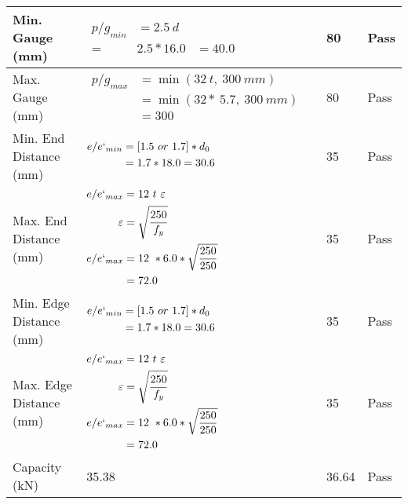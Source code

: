 \documentclass{article}%
\begin{document}
\begin{longtable}{|p{4cm}|p{5cm}|p{5.5cm}|p{1.5cm}|}
\hline%
Min. Gauge (mm)&$\begin{aligned}p/g_{min}&= 2.5 ~ d&\\ =&2.5*16.0&=40.0\end{aligned}$&80&Pass\\%
\hline%
Max. Gauge (mm)&$\begin{aligned}p/g_{max} &=\min(32~t,~300~mm)&\\ &=\min(32 *~5.7,~ 300 ~mm)\\&=300\end{aligned}$&80&Pass\\%
\hline%
Min. End Distance (mm)&$\begin{aligned}e/e`_{min} &=[1.5~or~ 1.7] * d_0\\ &=1.7*18.0=30.6 \end{aligned}$&35&Pass\\%
\hline%
Max. End Distance (mm)&$\begin{aligned}e/e`_{max} &= 12~ t~ \varepsilon&\\ \varepsilon &= \sqrt{\frac{250}{f_y}}\\ e/e`_{max}&=12 ~*6.0*\sqrt{\frac{250}{250}}\\ &=72.0\\ \end{aligned}$&35&Pass\\%
\hline%
Min. Edge Distance (mm)&$\begin{aligned}e/e`_{min} &=[1.5~or~ 1.7] * d_0\\ &=1.7*18.0=30.6 \end{aligned}$&35&Pass\\%
\hline%
Max. Edge Distance (mm)&$\begin{aligned}e/e`_{max} &= 12~ t~ \varepsilon&\\ \varepsilon &= \sqrt{\frac{250}{f_y}}\\ e/e`_{max}&=12 ~*6.0*\sqrt{\frac{250}{250}}\\ &=72.0\\ \end{aligned}$&35&Pass\\%
\hline%
Capacity (kN)&35.38&36.64&Pass\\%
\hline%
\end{longtable}

%
\newpage%
\end{document}
